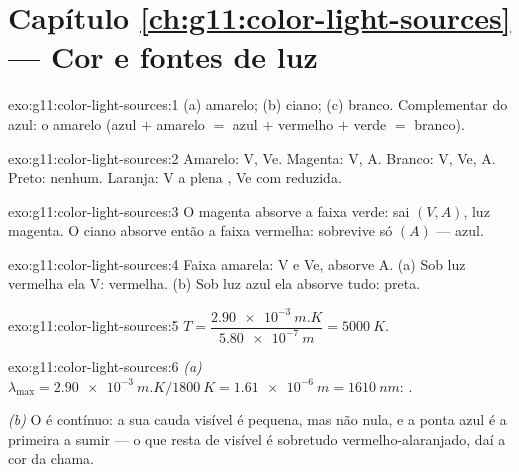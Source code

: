 \section*{Capítulo \ref{ch:g11:color-light-sources} --- Cor e fontes de luz}

\begin{solution}{exo:g11:color-light-sources:1}
(a) amarelo; (b) ciano; (c) branco. Complementar do azul: o amarelo
(azul $+$ amarelo $=$ azul $+$ vermelho $+$ verde $=$ branco).
\end{solution}

\begin{solution}{exo:g11:color-light-sources:2}
Amarelo: V, Ve. Magenta: V, A. Branco: V, Ve, A. Preto: nenhum. Laranja:
V a plena , Ve com  reduzida.
\end{solution}

\begin{solution}{exo:g11:color-light-sources:3}
O magenta absorve a faixa verde: sai $(V, A)$, luz magenta. O 
ciano absorve então a faixa vermelha: sobrevive só $(A)$ --- azul.
\end{solution}

\begin{solution}{exo:g11:color-light-sources:4}
Faixa amarela:  V e Ve, absorve A. (a) Sob luz vermelha ela
 V: vermelha. (b) Sob luz azul ela absorve tudo: preta.
\end{solution}

\begin{solution}{exo:g11:color-light-sources:5}
$T = \dfrac{\qty{2.90e-3}{m.K}}{\qty{5.80e-7}{m}} = \qty{5000}{K}$.
\end{solution}

\begin{solution}{exo:g11:color-light-sources:6}
\emph{(a)} $\lambda_{\max} = \qty{2.90e-3}{m.K}/\qty{1800}{K}
= \qty{1.61e-6}{m} = \qty{1610}{nm}$: .

\emph{(b)} O  é contínuo: a sua cauda visível é pequena, mas não
nula, e a ponta azul é a primeira a sumir --- o que resta de visível é
sobretudo vermelho-alaranjado, daí a cor da chama.
\end{solution}

